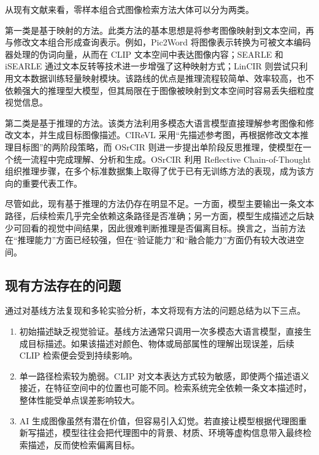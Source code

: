 \documentclass[12pt,a4paper,UTF8,oneside,openany]{ctexrep}
\begin{document}
从现有文献来看，零样本组合式图像检索方法大体可以分为两类。

第一类是基于映射的方法。此类方法的基本思想是将参考图像映射到文本空间，再与修改文本组合形成查询表示。例如，Pic2Word
将图像表示转换为可被文本编码器处理的伪词向量，从而在 CLIP
文本空间中表达图像内容；SEARLE 和 iSEARLE
通过文本反转等技术进一步增强了这种映射方式；LinCIR
则尝试只利用文本数据训练轻量映射模块。该路线的优点是推理流程较简单、效率较高，也不依赖强大的推理型大模型，但其局限在于图像被映射到文本空间时容易丢失细粒度视觉信息。

第二类是基于推理的方法。该类方法利用多模态大语言模型直接理解参考图像和修改文本，并生成目标图像描述。CIReVL
采用``先描述参考图，再根据修改文本推理目标图''的两阶段策略，而 OSrCIR
则进一步提出单阶段反思推理，使模型在一个统一流程中完成理解、分析和生成。OSrCIR
利用 Reflective Chain-of-Thought
组织推理步骤，在多个标准数据集上取得了优于已有无训练方法的表现，成为该方向的重要代表工作。

尽管如此，现有基于推理的方法仍存在明显不足。一方面，模型主要输出一条文本路径，后续检索几乎完全依赖这条路径是否准确；另一方面，模型生成描述之后缺少可回看的视觉中间结果，因此很难判断推理是否偏离目标。换言之，当前方法在``推理能力''方面已经较强，但在``验证能力''和``融合能力''方面仍有较大改进空间。

\hypertarget{ux73b0ux6709ux65b9ux6cd5ux5b58ux5728ux7684ux95eeux9898}{%
\subsection{现有方法存在的问题}\label{ux73b0ux6709ux65b9ux6cd5ux5b58ux5728ux7684ux95eeux9898}}

通过对基线方法复现和多轮实验分析，本文将现有方法的问题总结为以下三点。

\begin{enumerate}
\def\labelenumi{\arabic{enumi}.}
\item
  初始描述缺乏视觉验证。基线方法通常只调用一次多模态大语言模型，直接生成目标描述。如果该描述对颜色、物体或局部属性的理解出现误差，后续
  CLIP 检索便会受到持续影响。
\item
  单一路径检索较为脆弱。CLIP
  对文本表达方式较为敏感，即使两个描述语义接近，在特征空间中的位置也可能不同。检索系统完全依赖一条文本描述时，整体性能受单点误差影响较大。
\item
  AI
  生成图像虽然有潜在价值，但容易引入幻觉。若直接让模型根据代理图重新写描述，模型往往会把代理图中的背景、材质、环境等虚构信息带入最终检索描述，反而使检索偏离目标。
\end{enumerate}
\end{document}
